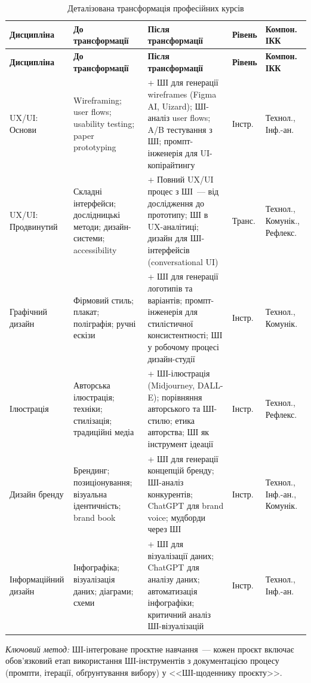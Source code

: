 \begin{longtable}{@{}p{}p{}p{}p{}p{}@{}}
\caption{Деталізована трансформація професійних курсів}\label{tab:app-professional} \\
\hline
\textbf{Дисципліна} & \textbf{До трансформації} & \textbf{Після трансформації} & \textbf{Рівень} & \textbf{Компон. ІКК} \\
\hline
\endfirsthead
\hline
\textbf{Дисципліна} & \textbf{До трансформації} & \textbf{Після трансформації} & \textbf{Рівень} & \textbf{Компон. ІКК} \\
\hline
\endhead
UX/UI: Основи & Wireframing; user flows; usability testing; paper prototyping & + ШІ для генерації wireframes (Figma AI, Uizard); ШІ-аналіз user flows; A/B тестування з ШІ; промпт-інженерія для UI-копірайтингу & Інстр. & Технол., Інф.-ан. \\
\addlinespace
UX/UI: Продвинутий & Складні інтерфейси; дослідницькі методи; дизайн-системи; accessibility & + Повний UX/UI процес з ШІ~--- від дослідження до прототипу; ШІ в UX-аналітиці; дизайн для ШІ-інтерфейсів (conversational UI) & Транс. & Технол., Комунік., Рефлекс. \\
\addlinespace
Графічний дизайн & Фірмовий стиль; плакат; поліграфія; ручні ескізи & + ШІ для генерації логотипів та варіантів; промпт-інженерія для стилістичної консистентності; ШІ у робочому процесі дизайн-студії & Інстр. & Технол., Комунік. \\
\addlinespace
Ілюстрація & Авторська ілюстрація; техніки; стилізація; традиційні медіа & + ШІ-ілюстрація (Midjourney, DALL-E); порівняння авторського та ШІ-стилю; етика авторства; ШІ як інструмент ідеації & Інстр. & Технол., Рефлекс. \\
\addlinespace
Дизайн бренду & Брендинг; позиціонування; візуальна ідентичність; brand book & + ШІ для генерації концепцій бренду; ШІ-аналіз конкурентів; ChatGPT для brand voice; мудборди через ШІ & Інстр. & Технол., Інф.-ан., Комунік. \\
\addlinespace
Інформаційний дизайн & Інфографіка; візуалізація даних; діаграми; схеми & + ШІ для візуалізації даних; ChatGPT для аналізу даних; автоматизація інфографіки; критичний аналіз ШІ-візуалізацій & Інстр. & Технол., Інф.-ан. \\
\hline
\end{longtable}

\textit{Ключовий метод:} ШІ-інтегроване проєктне навчання~--- кожен проєкт включає обов'язковий етап використання ШІ-інструментів з документацією процесу (промпти, ітерації, обґрунтування вибору) у <<ШІ-щоденнику проєкту>>.

